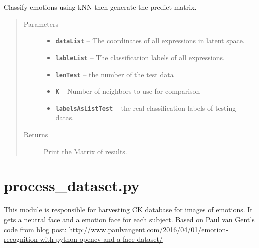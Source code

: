 \documentclass[letterpaper,10pt,english]{sphinxmanual}
\begin{document}
\begin{fulllineitems}
\label{Documentation of Code:classify.knn.predictMatrix}
Classify emotions using kNN then generate the predict matrix.
\begin{quote}\begin{description}
\item[{Parameters}] \leavevmode\begin{itemize}
\item {} 
\textbf{\texttt{dataList}} -- The coordinates of all expressions in latent space.

\item {} 
\textbf{\texttt{lableList}} -- The classification labels of all expressions.

\item {} 
\textbf{\texttt{lenTest}} -- the number of the test data

\item {} 
\textbf{\texttt{K}} -- Number of neighbors to use for comparison

\item {} 
\textbf{\texttt{labelsAsListTest}} -- the real classification labels of testing datas.

\end{itemize}

\item[{Returns}] \leavevmode
Print the Matrix of results.

\end{description}\end{quote}

\end{fulllineitems}



\section{process\_dataset.py}
\label{Documentation of Code:process-dataset-py}\label{Documentation of Code:module-dataSet.process_dataset}
This module is responsible for harvesting CK database for images of emotions. It gets a neutral face and a emotion face for each subject.
Based on Paul van Gent's code from blog post: \url{http://www.paulvangent.com/2016/04/01/emotion-recognition-with-python-opencv-and-a-face-dataset/}
\end{document}

